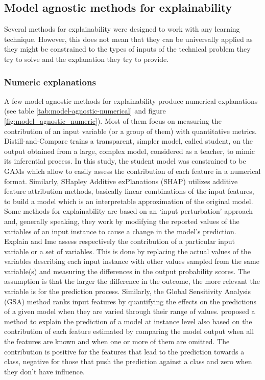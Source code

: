 \documentclass[final,1p,times]{elsarticle}
\begin{document}
\subsection{Model agnostic methods for explainability}
Several methods for explainability were designed to work with any learning technique. However, this does not mean that they can be universally applied as they might be constrained to the types of inputs of the technical problem they try to solve and the explanation they try to provide.


\subsubsection{Numeric explanations}
A few model agnostic methods for explainability produce numerical explanations (see table \ref{tab:model-agnostic-numerical} and figure \ref{fig:model_agnostic_numeric}). Most of them focus on measuring the contribution of an input variable (or a group of them) with quantitative metrics.
Distill-and-Compare \cite{tan2018distill} trains a transparent, simpler model, called student, on the output obtained from a large, complex model, considered as a teacher, to mimic its inferential process. In this study, the student model was constrained to be GAMs which allow to easily assess the contribution of each feature in a numerical format. Similarly, SHapley Additive exPlanations (SHAP) \cite{lundberg2017unified} utilizes additive feature attribution methods, basically linear combinations of the input features, to build a model which is an interpretable approximation of the original model.
Some methods for explainability are based on an `input perturbation' approach and, generally speaking, they work by modifying the reported values of the variables of an input instance to cause a change in the model's prediction.
Explain and Ime \cite{robnik2008explaining,robnik2018explanation} assess respectively the contribution of a particular input variable or a set of variables. This is done by replacing the actual values of the variables describing each input instance with other values sampled from the same variable(s) and measuring the differences in the output probability scores. The assumption is that the larger the difference in the outcome, the more relevant the variable is for the prediction process. 
Similarly, the Global Sensitivity Analysis (GSA) method \cite{cortez2011opening, cortez2013using} ranks input features by quantifying the effects on the predictions of a given model when they are varied through their range of values.
\cite{Kononenko10anefficient,kononenko2013explanation,vstrumbelj2009explaining,vstrumbelj2008towards,vstrumbelj2010explanation} proposed a method to explain the prediction of a model at instance level also based on the contribution of each feature estimated by comparing the model output when all the features are known and when one or more of them are omitted. The contribution is positive for the features that lead to the prediction towards a class, negative for those that push the prediction against a class and zero when they don't have influence.
\end{document}
